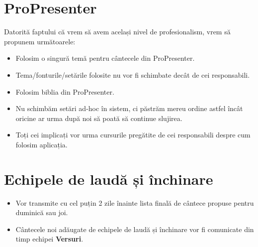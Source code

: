 \documentclass[epjST]{svjour}
\begin{document}
  \section{ProPresenter}
  \label{sec:7} Datorită faptului că vrem să avem același nivel de
  profesionalism, vrem să propunem următoarele:
  \begin{itemize}
    \item Folosim o singură temă pentru cântecele din ProPresenter.

    \item Tema/fonturile/setările folosite nu vor fi schimbate decât de cei responsabili.

    \item Folosim biblia din ProPresenter.

    \item Nu schimbăm setări ad-hoc în sistem, ci păstrăm mereu ordine astfel
      încât oricine ar urma după noi să poată să continue slujirea.

    \item Toți cei implicați vor urma cursurile pregătite de cei responsabili despre
      cum folosim aplicația.
  \end{itemize}

  \section{Echipele de laudă și închinare}
  \label{sec:8}
  \begin{itemize}
    \item Vor transmite cu cel puțin 2 zile înainte lista finală de cântece propuse
      pentru duminică sau joi.

    \item Cântecele noi adăugate de echipele de laudă și închinare vor fi comunicate
      din timp echipei \textbf{Versuri}.
  \end{itemize}
\end{document}
